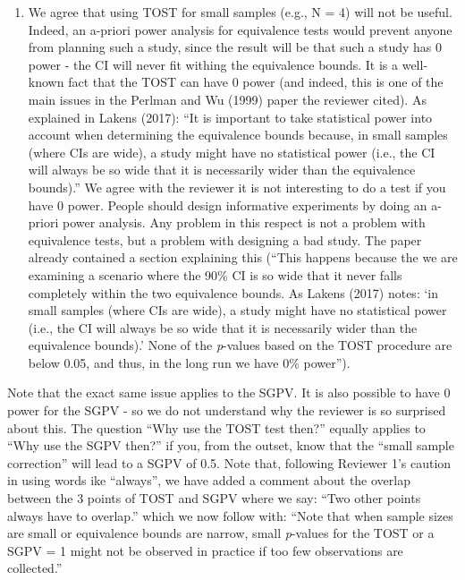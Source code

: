 \documentclass[man]{apa6}
\begin{document}
\begin{enumerate}
\item
  We agree that using TOST for small samples (e.g., N = 4) will not be
  useful. Indeed, an a-priori power analysis for equivalence tests would
  prevent anyone from planning such a study, since the result will be
  that such a study has 0 power - the CI will never fit withing the
  equivalence bounds. It is a well-known fact that the TOST can have 0
  power (and indeed, this is one of the main issues in the Perlman and
  Wu (1999) paper the reviewer cited). As explained in Lakens (2017):
  \enquote{It is important to take statistical power into account when
  determining the equivalence bounds because, in small samples (where
  CIs are wide), a study might have no statistical power (i.e., the CI
  will always be so wide that it is necessarily wider than the
  equivalence bounds).} We agree with the reviewer it is not interesting
  to do a test if you have 0 power. People should design informative
  experiments by doing an a-priori power analysis. Any problem in this
  respect is not a problem with equivalence tests, but a problem with
  designing a bad study. The paper already contained a section
  explaining this (\enquote{This happens because the we are examining a
  scenario where the 90\% CI is so wide that it never falls completely
  within the two equivalence bounds. As Lakens (2017) notes: \enquote{in
  small samples (where CIs are wide), a study might have no statistical
  power (i.e., the CI will always be so wide that it is necessarily
  wider than the equivalence bounds).} None of the \emph{p}-values based
  on the TOST procedure are below 0.05, and thus, in the long run we
  have 0\% power}).
\end{enumerate}

Note that the exact same issue applies to the SGPV. It is also possible
to have 0 power for the SGPV - so we do not understand why the reviewer
is so surprised about this. The question \enquote{Why use the TOST test
then?} equally applies to \enquote{Why use the SGPV then?} if you, from
the outset, know that the \enquote{small sample correction} will lead to
a SGPV of 0.5. Note that, following Reviewer 1's caution in using words
ike \enquote{always}, we have added a comment about the overlap between
the 3 points of TOST and SGPV where we say: \enquote{Two other points
always have to overlap.} which we now follow with: \enquote{Note that
when sample sizes are small or equivalence bounds are narrow, small
\emph{p}-values for the TOST or a SGPV = 1 might not be observed in
practice if too few observations are collected.}
\end{document}
